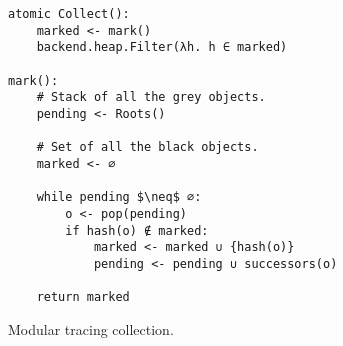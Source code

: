 \begin{figure}[!ht]
  \caption{Modular tracing collection.}
  \label{alg:modular-tracing}

  \centering
  \begin{lstlisting}
atomic Collect():
    marked <- mark()
    backend.heap.Filter(λh. h ∈ marked)

mark():
    # Stack of all the grey objects.
    pending <- Roots()

    # Set of all the black objects.
    marked <- ∅

    while pending $\neq$ ∅:
        o <- pop(pending)
        if hash(o) ∉ marked:
            marked <- marked ∪ {hash(o)}
            pending <- pending ∪ successors(o)

    return marked
\end{lstlisting}
\end{figure}
